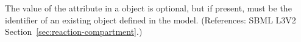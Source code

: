 The value of the attribute  in a \Reaction object is
optional, but if present, must be the identifier of an existing
\Compartment object defined in the model.  (References: SBML L3V2
Section~\ref{sec:reaction-compartment}.)
